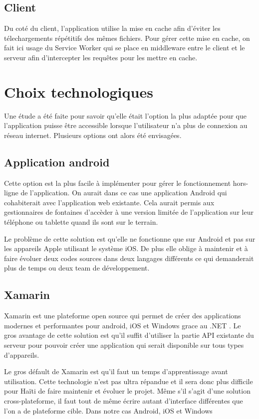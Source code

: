\documentclass{EPL-master-thesis-covers-FR}
\begin{document}
			\subsection*{Client}
				Du coté du client, l'application utilise la mise en cache afin d'éviter les télechargements répétitifs des mêmes fichiers. Pour gérer cette mise en cache, on fait ici usage du Service Worker qui se place en middleware entre le client et le serveur afin d'intercepter les requêtes pour les mettre en cache.

		
		\section{Choix technologiques}
			\label{sec:choix_tech}
			Une étude a été faite pour savoir qu'elle était l'option la plus adaptée pour que l'application puisse être accessible lorsque l'utilisateur n'a plus de connexion au réseau internet. Plusieurs options ont alors été envisagées.
			
			\subsection*{Application android}
				Cette option est la plus facile à implémenter pour gérer le fonctionnement hors-ligne de l'application. On aurait dans ce cas une application Android qui cohabiterait avec l'application web existante. Cela aurait permis aux gestionnaires de fontaines d'accèder à une version limitée de l'application sur leur téléphone ou tablette quand ils sont sur le terrain.
			
				Le problème de cette solution est qu'elle ne fonctionne que sur Android et pas sur les appareils Apple utilisant le système iOS. De plus elle oblige à maintenir et à faire évoluer deux codes sources dans deux langages différents ce qui demanderait plus de temps ou deux team de développement.
				
			\subsection*{Xamarin}
				Xamarin est une plateforme open source qui permet de créer des applications modernes et performantes pour android, iOS et Windows grace au .NET \cite{ref:xamarin}. Le gros avantage de cette solution est qu'il suffit d'utiliser la partie API existante du serveur pour pouvoir créer une application qui serait disponible sur tous types d'appareils.
			
				Le gros défault de Xamarin est qu'il faut un temps d'apprentissage avant utilisation. Cette technologie n'est pas ultra répandue et il sera donc plus difficile pour Haïti de faire maintenir et évoluer le projet. Même s'il s'agit d'une solution cross-plateforme, il faut tout de même écrire autant d'interface différentes que l'on a de plateforme cible. Dans notre cas Android, iOS et Windows
				
\end{document}
